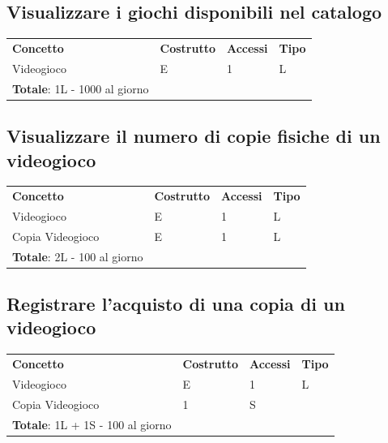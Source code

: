 \documentclass[a4paper,12pt]{report}
\begin{document}
\subsection*{Visualizzare i giochi disponibili nel catalogo}

\begin{table}[h!]
\begin{center}
	\begin{tabular}{ | m{4cm} P{4cm} P{4cm} P{4cm} | }
	\textbf{Concetto} & \textbf{Costrutto} & \textbf{Accessi} & \textbf{Tipo} \\
	Videogioco & E & 1 & L \\ \hline
	\textbf{Totale}: 1L - 1000 al giorno & & & \\
	\hline
	\end{tabular}
\end{center}
\end{table}

\subsection*{Visualizzare il numero di copie fisiche di un videogioco}

\begin{table}[h!]
\begin{center}
	\begin{tabular}{ | m{4cm} P{4cm} P{4cm} P{4cm} | }
	\textbf{Concetto} & \textbf{Costrutto} & \textbf{Accessi} & \textbf{Tipo} \\
	Videogioco & E & 1 & L \\ \hline
	Copia Videogioco & E & 1 & L \\ \hline
	\textbf{Totale}: 2L - 100 al giorno & & & \\
	\hline
	\end{tabular}
\end{center}
\end{table}

\subsection*{Registrare l'acquisto di una copia di un videogioco}

\begin{table}[h!]
\begin{center}
	\begin{tabular}{ | m{4cm} P{4cm} P{4cm} P{4cm} | }
	\textbf{Concetto} & \textbf{Costrutto} & \textbf{Accessi} & \textbf{Tipo} \\
	Videogioco & E & 1 & L \\ \hline
	Copia Videogioco & 1 & S \\ \hline
	\textbf{Totale}: 1L + 1S - 100 al giorno & & & \\
	\hline
	\end{tabular}
\end{center}
\end{table}
\end{document}
